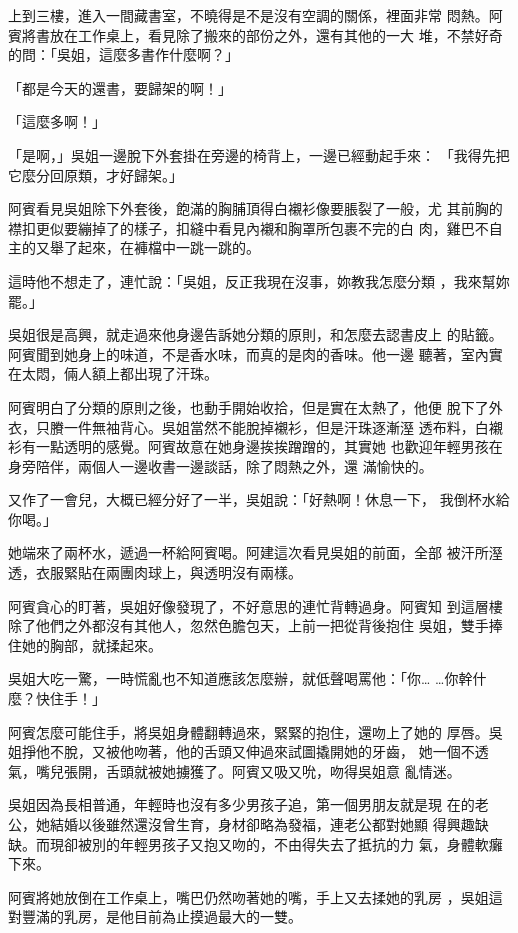上到三樓，進入一間藏書室，不曉得是不是沒有空調的關係，裡面非常
悶熱。阿賓將書放在工作桌上，看見除了搬來的部份之外，還有其他的一大
堆，不禁好奇的問：「吳姐，這麼多書作什麼啊？」

「都是今天的還書，要歸架的啊！」

「這麼多啊！」

「是啊，」吳姐一邊脫下外套掛在旁邊的椅背上，一邊已經動起手來：
「我得先把它麼分回原類，才好歸架。」

阿賓看見吳姐除下外套後，飽滿的胸脯頂得白襯衫像要脹裂了一般，尤
其前胸的襟扣更似要繃掉了的樣子，扣縫中看見內襯和胸罩所包裹不完的白
肉，雞巴不自主的又舉了起來，在褲檔中一跳一跳的。

這時他不想走了，連忙說：「吳姐，反正我現在沒事，妳教我怎麼分類
，我來幫妳罷。」

吳姐很是高興，就走過來他身邊告訴她分類的原則，和怎麼去認書皮上
的貼籤。阿賓聞到她身上的味道，不是香水味，而真的是肉的香味。他一邊
聽著，室內實在太悶，倆人額上都出現了汗珠。

阿賓明白了分類的原則之後，也動手開始收拾，但是實在太熱了，他便
脫下了外衣，只賸一件無袖背心。吳姐當然不能脫掉襯衫，但是汗珠逐漸溼
透布料，白襯衫有一點透明的感覺。阿賓故意在她身邊挨挨蹭蹭的，其實她
也歡迎年輕男孩在身旁陪伴，兩個人一邊收書一邊談話，除了悶熱之外，還
滿愉快的。

又作了一會兒，大概已經分好了一半，吳姐說：「好熱啊！休息一下，
我倒杯水給你喝。」

她端來了兩杯水，遞過一杯給阿賓喝。阿建這次看見吳姐的前面，全部
被汗所溼透，衣服緊貼在兩團肉球上，與透明沒有兩樣。

阿賓貪心的盯著，吳姐好像發現了，不好意思的連忙背轉過身。阿賓知
到這層樓除了他們之外都沒有其他人，忽然色膽包天，上前一把從背後抱住
吳姐，雙手捧住她的胸部，就揉起來。

吳姐大吃一驚，一時慌亂也不知道應該怎麼辦，就低聲喝罵他：「你…
…你幹什麼？快住手！」

阿賓怎麼可能住手，將吳姐身體翻轉過來，緊緊的抱住，還吻上了她的
厚唇。吳姐掙他不脫，又被他吻著，他的舌頭又伸過來試圖撬開她的牙齒，
她一個不透氣，嘴兒張開，舌頭就被她擄獲了。阿賓又吸又吮，吻得吳姐意
亂情迷。

吳姐因為長相普通，年輕時也沒有多少男孩子追，第一個男朋友就是現
在的老公，她結婚以後雖然還沒曾生育，身材卻略為發福，連老公都對她顯
得興趣缺缺。而現卻被別的年輕男孩子又抱又吻的，不由得失去了抵抗的力
氣，身體軟癱下來。

阿賓將她放倒在工作桌上，嘴巴仍然吻著她的嘴，手上又去揉她的乳房
，吳姐這對豐滿的乳房，是他目前為止摸過最大的一雙。

